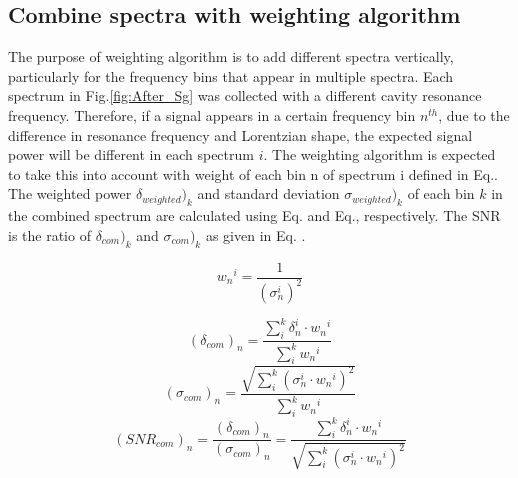 \subsection{Combine spectra with weighting algorithm} \label{weighting_algorithm}

The purpose of weighting algorithm is to add different spectra vertically, particularly for the frequency bins that appear in multiple spectra.  Each spectrum in Fig.\ref{fig:After_Sg} was collected with a different cavity resonance frequency. Therefore, if a signal appears in a certain frequency bin $n^{th}$, due to the difference in resonance frequency and Lorentzian shape, the expected signal power will be different in each spectrum $i$. The weighting algorithm is expected to take this into account with weight of each bin n of spectrum i defined in Eq.\cite{eq:weight}. The weighted power $\delta_{weighted})_k$ and standard deviation $\sigma_{weighted})_k$ of each bin $k$ in the combined spectrum are calculated using Eq.\cite{eq:weighted_power} and Eq.\cite{eq:weighted_sigma}, respectively. The SNR is the ratio of $\delta_{com})_k$ and $\sigma_{com})_k$ as given in Eq. \cite{eq:weighted_SNR}.


\begin{equation}
    \label{eq:weight}
    {w_{n}}^{i} = \frac{1}{(\sigma_{n}^{i})^{2}}
\end{equation}


\begin{equation}
    \label{eq:weighted_power}
    (\delta_{com})_n = \frac{ \sum_{i}^{k}\delta_{n}^{i} \cdot {w_{n}}^{i}}{\sum_{i}^{k} {w_{n}}^{i}}
\end{equation}
\begin{equation}
    \label{eq:weighted_sigma}
    (\sigma_{com})_n = \frac{ \sqrt{\sum_{i}^{k}(\sigma_{n}^{i} \cdot {w_{n}}^{i})^2}}{\sum_{i}^{k} {w_{n}}^{i}}
\end{equation}
\begin{equation}
    \label{eq:weighted_SNR}
    ({SNR}_{com})_n = \frac{(\delta_{com})_n}{(\sigma_{com})_n}= \frac{\sum_{i}^{k}\delta_{n}^{i} \cdot {w_{n}}^{i}}{ \sqrt{\sum_{i}^{k}(\sigma_{n}^{i} \cdot {w_{n}}^{i})^2}}
\end{equation}

